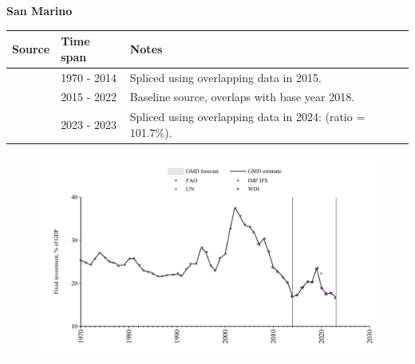 \documentclass[12pt,a4paper,landscape]{article}
\begin{document}
\begin{adjustbox}{max totalsize={\paperwidth}{\paperheight},center}
\begin{minipage}[t][\textheight][t]{\textwidth}
\vspace*{0.5cm}
{}
\begin{center}
{\Large\bfseries San Marino}
\end{center}
\vspace{0.5cm}
\begin{table}[H]
\centering
\small
\begin{tabular}{|l|l|l|}
\hline
\textbf{Source} & \textbf{Time span} & \textbf{Notes} \\
\hline
\rowcolor{white}\cite{UN}& 1970 - 2014 &Spliced using overlapping data in 2015.\\
\rowcolor{lightgray}\cite{WDI}& 2015 - 2022 &Baseline source, overlaps with base year 2018.\\
\rowcolor{white}\cite{FAO}& 2023 - 2023 &Spliced using overlapping data in 2024: (ratio = 101.7\%).\\
\hline
\end{tabular}
\end{table}
\begin{figure}[H]
\centering
\includegraphics[width=\textwidth,height=0.6\textheight,keepaspectratio]{graphs/SMR_finv_GDP.pdf}
\end{figure}
\end{minipage}
\end{adjustbox}
\end{document}
